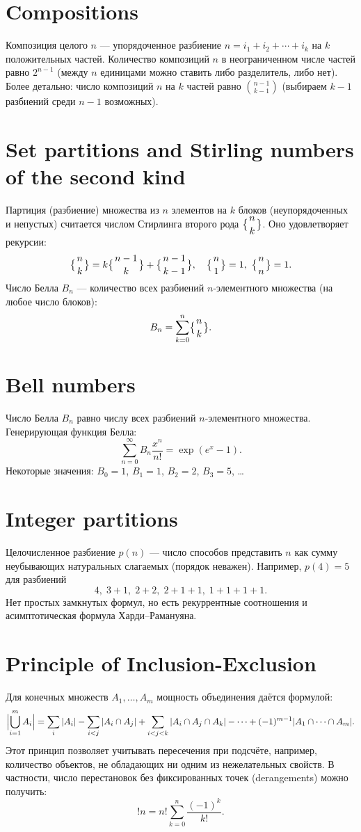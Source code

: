 \documentclass{article}
\begin{document}
	\section{Compositions}
	Композиция целого $n$ --- упорядоченное разбиение $n = i_1 + i_2 + \cdots + i_k$ на $k$ положительных частей. Количество композиций $n$ в неограниченном числе частей равно $2^{n-1}$ (между $n$ единицами можно ставить либо разделитель, либо нет). Более детально: число композиций $n$ на $k$ частей равно $\displaystyle \binom{n-1}{k-1}$ (выбираем $k-1$ разбиений среди $n-1$ возможных).
	
	\section{Set partitions and Stirling numbers of the second kind}
	Партиция (разбиение) множества из $n$ элементов на $k$ блоков (неупорядоченных и непустых) считается числом Стирлинга второго рода $\displaystyle \bigl\{{n\atop k}\bigr\}$. Оно удовлетворяет рекурсии:
	\[
	\bigl\{{n\atop k}\bigr\} = k\bigl\{{n-1\atop k}\bigr\} + \bigl\{{n-1\atop k-1}\bigr\}, 
	\quad \bigl\{{n\atop 1}\bigr\}=1,\ \bigl\{{n\atop n}\bigr\}=1.
	\]
	Число Белла $B_n$ --- количество всех разбиений $n$-элементного множества (на любое число блоков):
	\[
	B_n = \sum_{k=0}^n \bigl\{{n\atop k}\bigr\}.
	\]
	
	\section{Bell numbers}
	Число Белла $B_n$ равно числу всех разбиений $n$-элементного множества. Генерирующая функция Белла:
	\[
	\sum_{n=0}^\infty B_n \frac{x^n}{n!} = \exp(e^x - 1).
	\]
	Некоторые значения: $B_0=1$, $B_1=1$, $B_2=2$, $B_3=5$, \dots
	
	\section{Integer partitions}
	Целочисленное разбиение $p(n)$ --- число способов представить $n$ как сумму неубывающих натуральных слагаемых (порядок неважен). Например, $p(4)=5$ для разбиений 
	\[
	4,\;3+1,\;2+2,\;2+1+1,\;1+1+1+1.
	\]
	Нет простых замкнутых формул, но есть рекуррентные соотношения и асимптотическая формула Харди--Рамануяна.
	
	\section{Principle of Inclusion-Exclusion}
	Для конечных множеств $A_1,\dots,A_m$ мощность объединения даётся формулой:
	\[
	\Bigl|\bigcup_{i=1}^m A_i\Bigr| = \sum_{i}|A_i| - \sum_{i<j}|A_i\cap A_j| + \sum_{i<j<k}|A_i\cap A_j\cap A_k| - \cdots + (-1)^{m-1}|A_1\cap \cdots \cap A_m|.
	\]
	Этот принцип позволяет учитывать пересечения при подсчёте, например, количество объектов, не обладающих ни одним из нежелательных свойств. В частности, число перестановок без фиксированных точек (derangements) можно получить:
	\[
	!n = n!\sum_{k=0}^n \frac{(-1)^k}{k!}.
	\]
	
\end{document}

